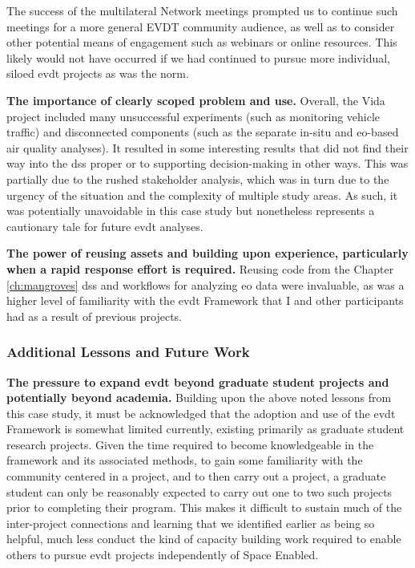 The success of the multilateral Network meetings prompted us to continue such meetings for a more general EVDT community audience, as well as to consider other potential means of engagement such as webinars or online resources. This likely would not have occurred if we had continued to pursue more individual, siloed \ac{evdt} projects as was the norm.

\textbf{The importance of clearly scoped problem and use.} Overall, the Vida project included many unsuccessful experiments (such as monitoring vehicle traffic) and disconnected components (such as the separate in-situ and \ac{eo}-based air quality analyses). It resulted in some interesting results that did not find their way into the \ac{dss} proper or to supporting decision-making in other ways. This was partially due to the rushed stakeholder analysis, which was in turn due to the urgency of the situation and the complexity of multiple study areas. As such, it was potentially unavoidable in this case study but nonetheless represents a cautionary tale for future \ac{evdt} analyses.

\textbf{The power of reusing assets and building upon experience, particularly when a rapid response effort is required.} Reusing code from the Chapter \ref{ch:mangroves} \ac{dss} and workflows for analyzing \ac{eo} data were invaluable, as was a higher level of familiarity with the \ac{evdt} Framework that I and other participants had as a result of previous projects.

\subsubsection{Additional Lessons and Future Work}

\textbf{The pressure to expand \ac{evdt} beyond graduate student projects and potentially beyond academia.} Building upon the above noted lessons from this case study, it must be acknowledged that the adoption and use of the \ac{evdt} Framework is somewhat limited currently, existing primarily as graduate student research projects. Given the time required to become knowledgeable in the framework and its associated methods, to gain some familiarity with the community centered in a project, and to then carry out a project, a graduate student can only be reasonably expected to carry out one to two such projects prior to completing their program. This makes it difficult to sustain much of the inter-project connections and learning that we identified earlier as being so helpful, much less conduct the kind of capacity building work required to enable others to pursue \ac{evdt} projects independently of Space Enabled.

